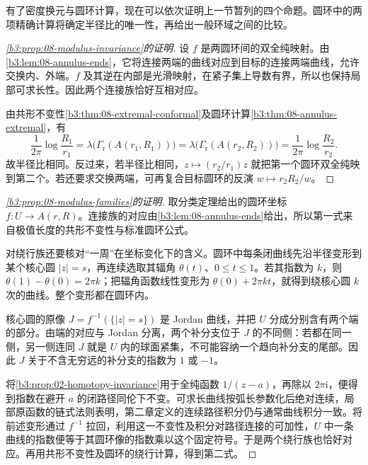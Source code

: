 \ProseParagraphBreak
有了密度换元与圆环计算，现在可以依次证明上一节暂列的四个命题。圆环中的两项精确计算将确定半径比的唯一性，再给出一般环域之间的比较。

\begin{proof}[\cref{b3:prop:08-modulus-invariance}的证明]
设 \(f\) 是两圆环间的双全纯映射。由\cref{b3:lem:08-annulus-ends}，它将连接两端的曲线对应到目标的连接两端曲线，允许交换内、外端。\(f\) 及其逆在内部是光滑映射，在紧子集上导数有界，所以也保持局部可求长性。因此两个连接族恰好互相对应。

由共形不变性\cref{b3:thm:08-extremal-conformal}及圆环计算\cref{b3:thm:08-annulus-extremal}，有
\[
 \frac1{2\pi}\log\frac{R_1}{r_1}
 =\lambda\bigl(\Gamma_{\mathrm r}(A(r_1,R_1))\bigr)
 =\lambda\bigl(\Gamma_{\mathrm r}(A(r_2,R_2))\bigr)
 =\frac1{2\pi}\log\frac{R_2}{r_2}.
\]
故半径比相同。反过来，若半径比相同，\(z\mapsto(r_2/r_1)z\) 就把第一个圆环双全纯映到第二个。若还要求交换两端，可再复合目标圆环的反演 \(w\mapsto r_2R_2/w\)。
\end{proof}

\begin{proof}[\cref{b3:prop:08-modulus-families}的证明]
取分类定理给出的圆环坐标 \(f:U\to A(r,R)\)。连接族的对应由\cref{b3:lem:08-annulus-ends}给出，所以第一式来自极值长度的共形不变性与标准圆环公式。

对绕行族还要核对“一周”在坐标变化下的含义。圆环中每条闭曲线先沿半径变形到某个核心圆 \(|z|=s\)，再连续选取其辐角 \(\theta(t)\)、\(0\le t\le1\)。若其指数为 \(k\)，则 \(\theta(1)-\theta(0)=2\pi k\)；把辐角函数线性变形为 \(\theta(0)+2\pi kt\)，就得到绕核心圆 \(k\) 次的曲线。整个变形都在圆环内。

核心圆的原像 \(J=f^{-1}(\{|z|=s\})\) 是 Jordan 曲线，并把 \(U\) 分成分别含有两个端的部分。由端的对应与 Jordan 分离，两个补分支位于 \(J\) 的不同侧：若都在同一侧，另一侧连同 \(J\) 就是 \(U\) 内的球面紧集，不可能容纳一个趋向补分支的尾部。因此 \(J\) 关于不含无穷远的补分支的指数为 \(1\) 或 \(-1\)。

将\cref{b3:prop:02-homotopy-invariance}用于全纯函数 \(1/(z-a)\)，再除以 \(2\pi\mathrm i\)，便得到指数在避开 \(a\) 的闭路径同伦下不变。可求长曲线按弧长参数化后绝对连续，局部原函数的链式法则表明，第二章定义的连续路径积分仍与通常曲线积分一致。将前述变形通过 \(f^{-1}\) 拉回，利用这一不变性及积分对路径连接的可加性，\(U\) 中一条曲线的指数便等于其圆环像的指数乘以这个固定符号。于是两个绕行族也恰好对应。再用共形不变性及圆环的绕行计算，得到第二式。
\end{proof}

